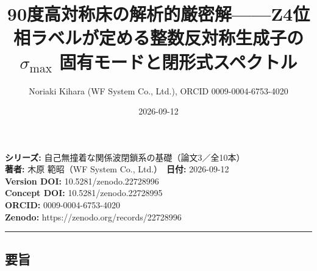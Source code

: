 \documentclass[
  a4paper,
]{ltjsarticle}
\title{90度高対称床の解析的厳密解------Z4位相ラベルが定める整数反対称生成子の
\(\sigma_{\max}\) 固有モードと閉形式スペクトル}
\author{Noriaki Kihara (WF System Co., Ltd.), ORCID 0009-0004-6753-4020}
\date{2026-09-12}
\begin{document}
\maketitle

\textbf{シリーズ:} 自己無撞着な関係波閉鎖系の基礎（論文3／全10本）\\
\textbf{著者:} 木原 範昭（WF System Co., Ltd.）　\textbf{日付:}
2026-09-12\\
\textbf{Version DOI:} 10.5281/zenodo.22728996\\
\textbf{Concept DOI:} 10.5281/zenodo.22728995\\
\textbf{ORCID:} 0009-0004-6753-4020\\
\textbf{Zenodo:} https://zenodo.org/records/22728996\\

\begin{center}\rule{0.5\linewidth}{0.5pt}\end{center}

\subsection{要旨}\label{ux8981ux65e8}
\end{document}
